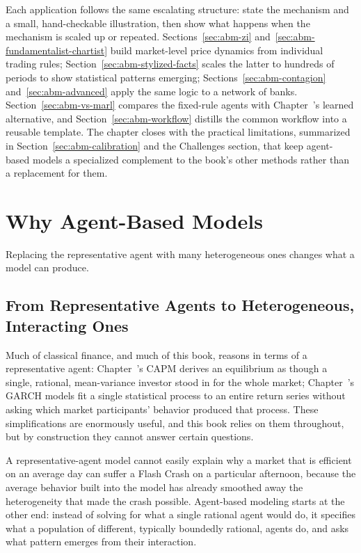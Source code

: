\documentclass[../ai_in_finance]{subfiles}
\begin{document}
Each application follows the same escalating structure: state the mechanism and a small, hand-checkable illustration, then show what happens when the mechanism is scaled up or repeated. Sections~\ref{sec:abm-zi} and~\ref{sec:abm-fundamentalist-chartist} build market-level price dynamics from individual trading rules; Section~\ref{sec:abm-stylized-facts} scales the latter to hundreds of periods to show statistical patterns emerging; Sections~\ref{sec:abm-contagion} and~\ref{sec:abm-advanced} apply the same logic to a network of banks. Section~\ref{sec:abm-vs-marl} compares the fixed-rule agents with Chapter~'s learned alternative, and Section~\ref{sec:abm-workflow} distills the common workflow into a reusable template. The chapter closes with the practical limitations, summarized in Section~\ref{sec:abm-calibration} and the Challenges section, that keep agent-based models a specialized complement to the book's other methods rather than a replacement for them.

\section{Why Agent-Based Models}

Replacing the representative agent with many heterogeneous ones changes what a model can produce.

\subsection{From Representative Agents to Heterogeneous, Interacting Ones}
\label{sec:abm-why}

Much of classical finance, and much of this book, reasons in terms of a representative agent: Chapter~'s CAPM derives an equilibrium as though a single, rational, mean-variance investor stood in for the whole market; Chapter~'s GARCH models fit a single statistical process to an entire return series without asking which market participants' behavior produced that process. These simplifications are enormously useful, and this book relies on them throughout, but by construction they cannot answer certain questions.

A representative-agent model cannot easily explain why a market that is efficient on an average day can suffer a Flash Crash on a particular afternoon, because the average behavior built into the model has already smoothed away the heterogeneity that made the crash possible. Agent-based modeling starts at the other end: instead of solving for what a single rational agent would do, it specifies what a population of different, typically boundedly rational, agents do, and asks what pattern emerges from their interaction.
\end{document}
